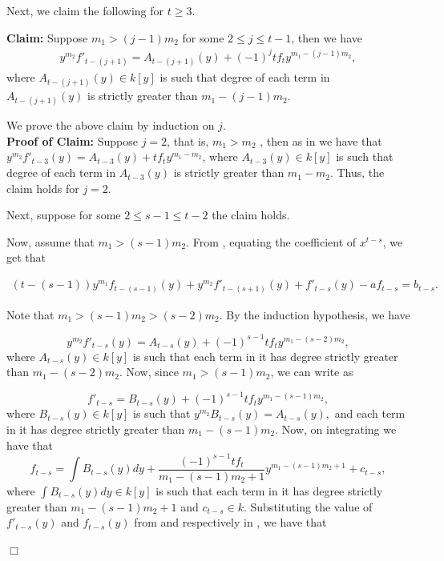 \documentclass[12pt,reqno]{amsart}
\renewcommand{\leq}{\leqslant}
\renewcommand{\geq}{\geqslant}
\numberwithin{thm}{section}
\theoremstyle{definition}
\numberwithin{equation}{thm}
\renewenvironment{proof}{\par\noindent {\em Proof:}}{\hfill$\Box$\medskip}
\theoremstyle{plain}
\begin{document}
\begin{proof}
	Next, we claim the following for $t\geq 3$.
	
	\textbf{Claim:} Suppose $m_1>(j-1)m_2$ for some $2\leq j \leq t-1$, then we have 
	\begin{align}\label{claim-old}
		y^{m_2}f'_{t-(j+1)}=A_{t-(j+1)}(y)+(-1)^{j}tf_ty^{m_1-(j-1)m_2},
	\end{align} 
	where $A_{t-(j+1)}(y)\in k[y]$ is such that degree of each term in $A_{t-(j+1)}(y)$ is strictly greater than $m_1-(j-1)m_2$.
	
	\vspace{2mm}
		We prove the above claim by induction on $j$. \\
	\textbf{Proof of Claim:} Suppose $j=2$, that is, $m_1>m_2$ , then as in  we have that $y^{m_2}f'_{t-3}(y)=A_{t-3}(y)+tf_ty^{m_1-m_2}$, where  $A_{t-3}(y)\in k[y]$ is such that degree of each term in $A_{t-3}(y)$ is strictly greater than $m_1-m_2.$ 
	Thus, the claim holds for $j=2$.

    Next, suppose for some $2\leq s-1\leq t-2$ the claim holds.  
	
	Now, assume that $m_1>(s-1)m_2$. From , equating the coefficient of $x^{t-s}$, we get that
	
	
	\begin{align}\label{eqn7}
		(t-(s-1))y^{m_1}f_{t-(s-1)}(y)+y^{m_2}f'_{t-(s+1)}(y)+f'_{t-s}(y)-af_{t-s}=b_{t-s}. 
	\end{align}
	
	Note that $m_1>(s-1)m_2>(s-2)m_2$. By the induction hypothesis, we have
	
	\begin{equation}\label{eqn8-old}
		y^{m_2}f'_{t-s}(y)=A_{t-s}(y)+(-1)^{s-1}tf_ty^{m_1-(s-2)m_2},
	\end{equation}
	where $A_{t-s}(y)\in k[y]$ is such that each term in it has degree strictly greater than $m_1-(s-2)m_2$.
	Now, since $m_1>(s-1)m_2$, we can write  as 
	
	\begin{equation}\label{eqn9-old}
		f'_{t-s}=B_{t-s}(y)+(-1)^{s-1}tf_ty^{m_1-(s-1)m_2},
	\end{equation}where $B_{t-s}(y)\in k[y]$ is such that $y^{m_2}B_{t-s}(y)=A_{t-s}(y),$ and each term in it has degree strictly greater than $m_1-(s-1)m_2$. Now, on integrating  we have that
    \begin{equation}\label{eqn9'-old}
		f_{t-s}=\int B_{t-s}(y)dy+\frac{(-1)^{s-1}tf_t}{m_1-(s-1)m_2+1}y^{m_1-(s-1)m_2+1}+c_{t-s},
	\end{equation} where $\int B_{t-s}(y)dy\in k[y]$ is such that each term in it has degree strictly greater than $m_1-(s-1)m_2+1$ and $c_{t-s}\in k.$
    Substituting the value of $f'_{t-s}(y)$ and $f_{t-s}(y)$ from  and  respectively in , we have that 
	

\end{proof}
\end{document}
